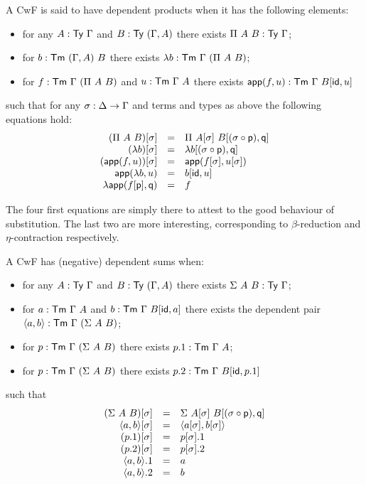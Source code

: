 A \acrshort{CwF} is said to have dependent products when it has the following
elements:
\begin{itemize}
  \item for any \(A : \mathsf{Ty}\ \Gamma\) and \(B : \mathsf{Ty}\ (\Gamma, A)\) there exists
  \(\Pi\ A\ B : \mathsf{Ty}\ \Gamma\);
  \item for \(b : \mathsf{Tm}\ (\Gamma, A)\ B\) there exists
  \(\lambda b : \CTm\ \Ga\ (\Pi\ A\ B)\);
  \item for \(f : \mathsf{Tm}\ \Gamma\ (\Pi\ A\ B)\) and \(u : \mathsf{Tm}\ \Gamma\ A\) there exists
  \(\mathsf{app}(f,u) : \mathsf{Tm}\ \Gamma\ B[\mathsf{id}, u]\)
\end{itemize}
such that for any \(\sigma : \Delta \to \Gamma\) and terms and types as above the
following equations hold:
\[
  \begin{array}{rcl}
    (\Pi\ A\ B)[\sigma] &=& \Pi\ A[\sigma]\ B[(\sigma \circ \mathsf{p}), \mathsf{q}] \\
    (\lambda b)[\sigma] &=& \lambda b[(\sigma \circ \mathsf{p}), \mathsf{q}] \\
    (\mathsf{app}(f,u))[\sigma] &=& \mathsf{app}(f[\sigma],u[\sigma]) \\
    \mathsf{app}(\lambda b, u) &=& b[\mathsf{id}, u] \\
    \lambda \mathsf{app}(f[\mathsf{p}], \mathsf{q}) &=& f
  \end{array}
\]

The four first equations are simply there to attest to the good behaviour of
substitution. The last two are more interesting, corresponding to
\(\beta\)-reduction and \(\eta\)-contraction respectively.


A \acrshort{CwF} has (negative) dependent sums
when:
\begin{itemize}
  \item for any \(A : \mathsf{Ty}\ \Gamma\) and \(B : \mathsf{Ty}\ (\Gamma, A)\) there exists
  \(\Sigma\ A\ B : \mathsf{Ty}\ \Gamma\);
  \item for \(a : \mathsf{Tm}\ \Gamma\ A\) and \(b : \mathsf{Tm}\ \Gamma\ B[\mathsf{id},a]\) there exists
  the dependent pair \(\dpair{a,b} : \CTm\ \Ga\ (\Sigma\ A\ B)\);
  \item for \(p : \CTm\ \Ga\ (\Sigma\ A\ B)\) there exists
  \(p.1 : \CTm\ \Ga\ A\);
  \item for \(p : \CTm\ \Ga\ (\Sigma\ A\ B)\) there exists
  \(p.2 : \CTm\ \Ga\ B[\cid, p.1]\)
\end{itemize}
such that
\[
  \begin{array}{rcl}
    (\Sigma\ A\ B)[\sigma] &=& \Sigma\ A[\sigma]\ B[(\sigma \circ \mathsf{p}), \mathsf{q}] \\
    \langle a,b \rangle[\sigma] &=& \langle a[\sigma], b[\sigma] \rangle \\
    (p.1)[\sigma] &=& p[\sigma].1 \\
    (p.2)[\sigma] &=& p[\sigma].2 \\
    \langle a,b \rangle.1 &=& a \\
    \langle a,b \rangle.2 &=& b
  \end{array}
\]

